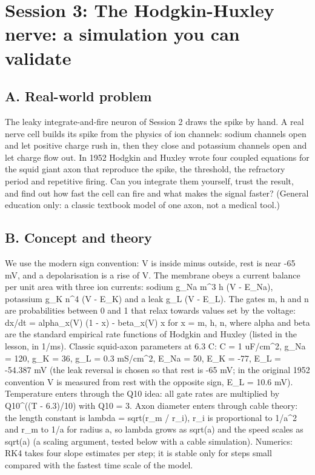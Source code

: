 \documentclass[11pt,a4paper]{article}
\begin{document}
\section{Session 3: The Hodgkin-Huxley nerve: a simulation you can validate}

\subsection*{A. Real-world problem}
The leaky integrate-and-fire neuron of Session 2 draws the spike by hand. A real nerve cell builds its spike from the physics of ion channels: sodium channels open and let positive charge rush in, then they close and potassium channels open and let charge flow out. In 1952 Hodgkin and Huxley wrote four coupled equations for the squid giant axon that reproduce the spike, the threshold, the refractory period and repetitive firing. Can you integrate them yourself, trust the result, and find out how fast the cell can fire and what makes the signal faster? (General education only: a classic textbook model of one axon, not a medical tool.)

\subsection*{B. Concept and theory}
We use the modern sign convention: V is inside minus outside, rest is near -65 mV, and a depolarisation is a rise of V. The membrane obeys a current balance per unit area with three ion currents: sodium g\_Na m\textasciicircum{}3 h (V - E\_Na), potassium g\_K n\textasciicircum{}4 (V - E\_K) and a leak g\_L (V - E\_L). The gates m, h and n are probabilities between 0 and 1 that relax towards values set by the voltage: dx/dt = alpha\_x(V) (1 - x) - beta\_x(V) x for x = m, h, n, where alpha and beta are the standard empirical rate functions of Hodgkin and Huxley (listed in the lesson, in 1/ms). Classic squid-axon parameters at 6.3 C: C = 1 uF/cm\textasciicircum{}2, g\_Na = 120, g\_K = 36, g\_L = 0.3 mS/cm\textasciicircum{}2, E\_Na = 50, E\_K = -77, E\_L = -54.387 mV (the leak reversal is chosen so that rest is -65 mV; in the original 1952 convention V is measured from rest with the opposite sign, E\_L = 10.6 mV). Temperature enters through the Q10 idea: all gate rates are multiplied by Q10\textasciicircum{}((T - 6.3)/10) with Q10 = 3. Axon diameter enters through cable theory: the length constant is lambda = sqrt(r\_m / r\_i), r\_i is proportional to 1/a\textasciicircum{}2 and r\_m to 1/a for radius a, so lambda grows as sqrt(a) and the speed scales as sqrt(a) (a scaling argument, tested below with a cable simulation). Numerics: RK4 takes four slope estimates per step; it is stable only for steps small compared with the fastest time scale of the model.
\end{document}
